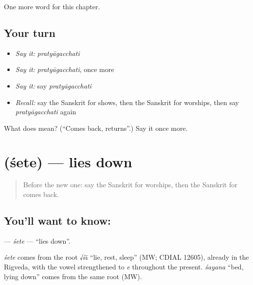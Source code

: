 \begin{grammarlens}[title={What you've built}]
One more word for this chapter.
\end{grammarlens}

\subsection*{Your turn}
\begin{itemize}
\raggedright
  \item \emph{Say it:} \emph{pratyāgacchati}
  \item \emph{Say it:} \emph{pratyāgacchati}, once more
  \item \emph{Say it:} say \emph{pratyāgacchati}
  \item \emph{Recall:} say the Sanskrit for shows, then the Sanskrit for worships, then say \emph{pratyāgacchati} again
\end{itemize}

\begin{tcolorbox}[breakable,colback=teal!4,colframe=teal!35!black,title={Before you move on}]
What does  mean? (\textquotedblleft{}Comes back, returns\textquotedblright{}.) Say it once more.
\end{tcolorbox}
\section[\texorpdfstring{\sk{शेते} (śete)}{शेते (śete)}]{ (śete) — lies down}

\label{lesson:SA-C143-sete}



\begin{quote}
Before the new one: say the Sanskrit for worships, then the Sanskrit for comes back.
\end{quote}

\subsection*{You'll want to know: }
\textbf{} — \emph{śete} — \textquotedblleft{}lies down\textquotedblright{}.

\begin{cousinweb}
\emph{śete} comes from the root √śī \textquotedblleft{}lie, rest, sleep\textquotedblright{} (MW; CDIAL 12605), already in the Rigveda, with the vowel strengthened to \emph{e} throughout the present. \emph{śayana} \textquotedblleft{}bed, lying down\textquotedblright{} comes from the same root (MW).
\end{cousinweb}

